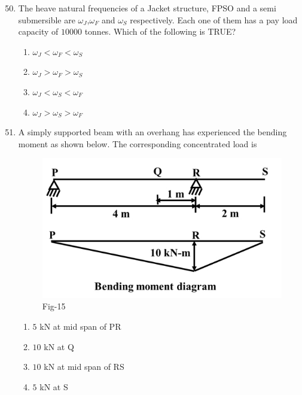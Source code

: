 \documentclass[journal]{IEEEtran}
\theoremstyle{remark}
\begin{document}
\begin{enumerate}[itemsep=1em]
\setcounter{enumi}{49}
\item The heave natural frequencies of a Jacket structure, FPSO and a semi submersible are  $\omega_J$,$\omega_F$ and $\omega_S$ respectively. Each one of them has a pay load capacity of $10000$ tonnes.  Which of the following is TRUE?
\begin{multicols}{4}
\begin{enumerate}
    \item $\omega_J < \omega_F < \omega_S$
    \item $\omega_J > \omega_F > \omega_S$
    \item $\omega_J < \omega_S < \omega_F$
    \item $\omega_J > \omega_S > \omega_F$
\end{enumerate}
\end{multicols}
\end{enumerate}

\begin{enumerate}[itemsep=1em]
\setcounter{enumi}{50}
\item A simply supported beam with an overhang has experienced the bending moment as shown below. The corresponding concentrated load is
\begin{figure}[H]
    \centering
    \includegraphics[width=0.4\columnwidth]{figs/fig-15.jpeg}
    \caption*{Fig-15}
    \label{fig-15}
\end{figure}
\begin{enumerate}[leftmargin=2.5em, labelsep=0.5em, itemsep=0.5em]
    \item $5$ kN at mid span of PR 
    \item $10$ kN at Q 
    \item $10$ kN at mid span of RS 
    \item $5$ kN at S 
\end{enumerate}
\end{enumerate}

\newpage
\vspace*{0.25cm}
\end{document}
